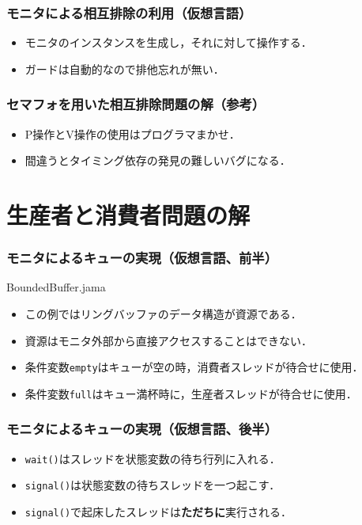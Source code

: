 \documentclass[unicode,handout]{beamer}                   %
\begin{document}
\begin{frame}
  \frametitle{モニタによる相互排除の利用（仮想言語）}

  \begin{itemize}
  \item モニタのインスタンスを生成し，それに対して操作する．
  \item ガードは自動的なので排他忘れが無い．
  \end{itemize}
\end{frame}

\begin{frame}
  \frametitle{セマフォを用いた相互排除問題の解（参考）}

  \begin{itemize}
  \item P操作とV操作の使用はプログラマまかせ．
  \item 間違うとタイミング依存の発見の難しいバグになる．
  \end{itemize}
\end{frame}

\section{生産者と消費者問題の解}
\begin{frame}
  \frametitle{モニタによるキューの実現（仮想言語、前半）}
      {BoundedBuffer.jama}

  \begin{itemize}
  \item この例ではリングバッファのデータ構造が資源である．
  \item 資源はモニタ外部から直接アクセスすることはできない．
  \item 条件変数{\tt empty}はキューが空の時，消費者スレッドが待合せに使用．
  \item 条件変数{\tt full}はキュー満杯時に，生産者スレッドが待合せに使用．
  \end{itemize}
\end{frame}

\begin{frame}
  \frametitle{モニタによるキューの実現（仮想言語、後半）}

  \begin{itemize}
  \item {\tt wait()}はスレッドを状態変数の待ち行列に入れる．
  \item {\tt signal()}は状態変数の待ちスレッドを一つ起こす．
  \item {\tt signal()}で起床したスレッドは{\bf ただちに}実行される．
  \end{itemize}
\end{frame}
\end{document}
